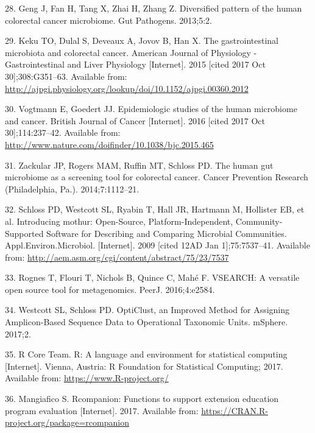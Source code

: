 \documentclass[12pt,]{article}
\begin{document}
\hypertarget{ref-geng_diversified_2013}{}
28. Geng J, Fan H, Tang X, Zhai H, Zhang Z. Diversified pattern of the
human colorectal cancer microbiome. Gut Pathogens. 2013;5:2.

\hypertarget{ref-keku_gastrointestinal_2015}{}
29. Keku TO, Dulal S, Deveaux A, Jovov B, Han X. The gastrointestinal
microbiota and colorectal cancer. American Journal of Physiology -
Gastrointestinal and Liver Physiology {[}Internet{]}. 2015 {[}cited 2017
Oct 30{]};308:G351--63. Available from:
\url{http://ajpgi.physiology.org/lookup/doi/10.1152/ajpgi.00360.2012}

\hypertarget{ref-vogtmann_epidemiologic_2016}{}
30. Vogtmann E, Goedert JJ. Epidemiologic studies of the human
microbiome and cancer. British Journal of Cancer {[}Internet{]}. 2016
{[}cited 2017 Oct 30{]};114:237--42. Available from:
\url{http://www.nature.com/doifinder/10.1038/bjc.2015.465}

\hypertarget{ref-zackular_human_2014}{}
31. Zackular JP, Rogers MAM, Ruffin MT, Schloss PD. The human gut
microbiome as a screening tool for colorectal cancer. Cancer Prevention
Research (Philadelphia, Pa.). 2014;7:1112--21.

\hypertarget{ref-schloss_introducing_2009}{}
32. Schloss PD, Westcott SL, Ryabin T, Hall JR, Hartmann M, Hollister
EB, et al. Introducing mothur: Open-Source, Platform-Independent,
Community-Supported Software for Describing and Comparing Microbial
Communities. Appl.Environ.Microbiol. {[}Internet{]}. 2009 {[}cited 12AD
Jan 1{]};75:7537--41. Available from:
\url{http://aem.asm.org/cgi/content/abstract/75/23/7537}

\hypertarget{ref-rognes_vsearch_2016}{}
33. Rognes T, Flouri T, Nichols B, Quince C, Mahé F. VSEARCH: A
versatile open source tool for metagenomics. PeerJ. 2016;4:e2584.

\hypertarget{ref-westcott_opticlust_2017}{}
34. Westcott SL, Schloss PD. OptiClust, an Improved Method for Assigning
Amplicon-Based Sequence Data to Operational Taxonomic Units. mSphere.
2017;2.

\hypertarget{ref-r_citation_2017}{}
35. R Core Team. R: A language and environment for statistical computing
{[}Internet{]}. Vienna, Austria: R Foundation for Statistical Computing;
2017. Available from: \url{https://www.R-project.org/}

\hypertarget{ref-rcompanion_citation_2017}{}
36. Mangiafico S. Rcompanion: Functions to support extension education
program evaluation {[}Internet{]}. 2017. Available from:
\url{https://CRAN.R-project.org/package=rcompanion}
\end{document}
